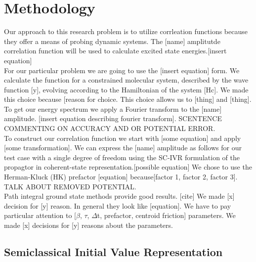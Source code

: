 \documentclass[12pt,letterpaper,oneside,final,titlepage]{article}               %
\numberwithin{equation}{section} %
\begin{document}
\section{Methodology}

Our approach to this research problem is to utilize corrleation functions because they offer a means of probing dynamic systems. The [name] amplitutde correlation function will be used to calculate excited state energies.[insert equation]\\
For our particular problem we are going to use the [insert equation] form. We calculate the function for a constrained molecular system, described by the wave function [y], evolving according to the Hamiltonian of the system [Hc]. We made this choice because [reason for choice. This choice allows us to [thing] and [thing]. \\
To get our energy spectrum we apply a Fourier transform to the [name] amplitude. [insert equation describing fourier transform]. SCENTENCE COMMENTING ON ACCURACY AND OR POTENTIAL ERROR. \\

To construct our correlation function we start with [some equation] and apply [some transformation]. We can express the [name] amplitude as follows for our test case with a single degree of freedom using the SC-IVR formulation of the propagtor in coherent-state representation.[possible equation] We chose to use the Herman-Kluck (HK) prefactor [equation] because[factor 1, factor 2, factor 3].~\cite{kay2006herman} TALK ABOUT REMOVED POTENTIAL. \\

Path integral ground state methods provide good results. [cite] We made [x] decision for [y] reason. In general they look like [equation]. We have to pay particular attention to [$\beta$, $\tau$, $\Delta$t, prefactor, centroid friction] parameters. We made [x] decisions for [y] reasons about the parameters.

\subsection*{Semiclassical Initial Value Representation}
\end{document}
